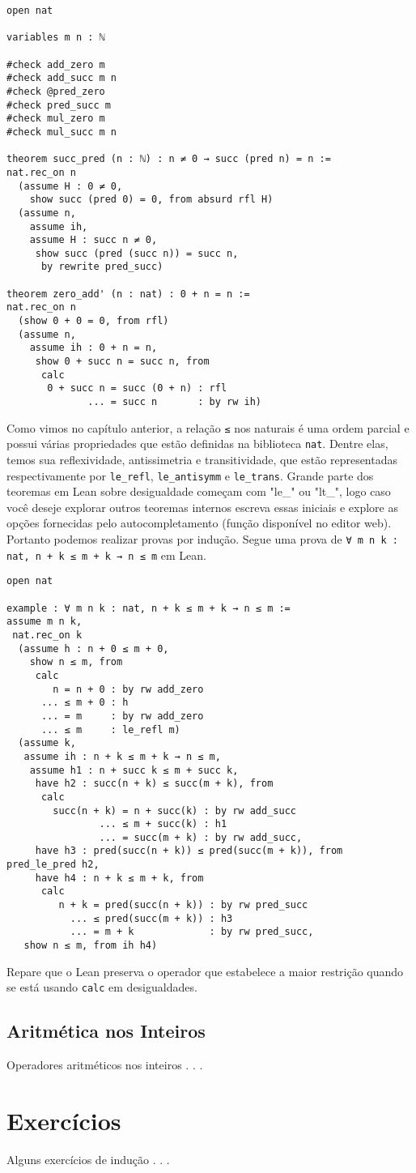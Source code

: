 \begin{lstlisting}
open nat

variables m n : ℕ

#check add_zero m
#check add_succ m n
#check @pred_zero
#check pred_succ m
#check mul_zero m
#check mul_succ m n

theorem succ_pred (n : ℕ) : n ≠ 0 → succ (pred n) = n :=
nat.rec_on n
  (assume H : 0 ≠ 0,
    show succ (pred 0) = 0, from absurd rfl H)
  (assume n,
    assume ih,
    assume H : succ n ≠ 0,
     show succ (pred (succ n)) = succ n,
      by rewrite pred_succ)

theorem zero_add' (n : nat) : 0 + n = n :=
nat.rec_on n
  (show 0 + 0 = 0, from rfl)
  (assume n,
    assume ih : 0 + n = n,
     show 0 + succ n = succ n, from
      calc
       0 + succ n = succ (0 + n) : rfl
              ... = succ n       : by rw ih)
\end{lstlisting}

Como vimos no capítulo anterior, a relação \lstinline{≤} nos naturais é uma ordem parcial e possui várias propriedades que estão definidas na biblioteca \lstinline{nat}. Dentre elas, temos sua reflexividade, antissimetria e transitividade, que estão representadas respectivamente por \lstinline{le_refl}, \lstinline{le_antisymm} e \lstinline{le_trans}. Grande parte dos teoremas em Lean sobre desigualdade começam com "le\_" ou "lt\_", logo caso você deseje explorar outros teoremas internos escreva essas iniciais e explore as opções fornecidas pelo autocompletamento (função disponível no editor web). Portanto podemos realizar provas por indução. Segue uma prova de \lstinline{∀ m n k : nat, n + k ≤ m + k → n ≤ m} em Lean.

\begin{lstlisting}
open nat

example : ∀ m n k : nat, n + k ≤ m + k → n ≤ m := 
assume m n k,
 nat.rec_on k 
  (assume h : n + 0 ≤ m + 0,
    show n ≤ m, from 
     calc
        n = n + 0 : by rw add_zero
      ... ≤ m + 0 : h
      ... = m     : by rw add_zero
      ... ≤ m     : le_refl m)
  (assume k,
   assume ih : n + k ≤ m + k → n ≤ m,
    assume h1 : n + succ k ≤ m + succ k,
     have h2 : succ(n + k) ≤ succ(m + k), from 
      calc
        succ(n + k) = n + succ(k) : by rw add_succ
                ... ≤ m + succ(k) : h1
                ... = succ(m + k) : by rw add_succ,
     have h3 : pred(succ(n + k)) ≤ pred(succ(m + k)), from pred_le_pred h2,
     have h4 : n + k ≤ m + k, from 
      calc
         n + k = pred(succ(n + k)) : by rw pred_succ
           ... ≤ pred(succ(m + k)) : h3
           ... = m + k             : by rw pred_succ, 
   show n ≤ m, from ih h4)
\end{lstlisting}

Repare que o Lean preserva o operador que estabelece a maior restrição quando se está usando \lstinline{calc} em desigualdades.

\subsection{Aritmética nos Inteiros}

Operadores aritméticos nos inteiros . . .

\section{Exercícios}

Alguns exercícios de indução . . .

